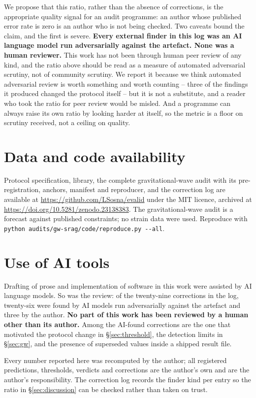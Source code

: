 \documentclass[11pt,a4paper]{article}
\begin{document}
We propose that this ratio, rather than the absence of corrections, is the
appropriate quality signal for an audit programme: an author whose published
error rate is zero is an author who is not being checked. Two caveats bound the
claim, and the first is severe. \textbf{Every external finder in this log was
an AI language model run adversarially against the artefact. None was a human
reviewer.} This work has not been through human peer review of any kind, and
the ratio above should be read as a measure of automated adversarial scrutiny,
not of community scrutiny. We report it because we think automated adversarial
review is worth something and worth counting -- three of the findings it
produced changed the protocol itself -- but it is not a substitute, and a
reader who took the ratio for peer review would be misled. And a programme can
always raise its own ratio by looking
harder at itself, so the metric is a floor on scrutiny received, not a ceiling
on quality.

\section*{Data and code availability}

Protocol specification, library, the complete gravitational-wave audit with its
pre-registration, anchors, manifest and reproducer, and the correction log are
available at \url{https://github.com/LSosna/evalid} under the MIT licence, archived at
\url{https://doi.org/10.5281/zenodo.23138383}. The gravitational-wave audit is a forecast against published
constraints; no strain data were used. Reproduce with
\texttt{python audits/gw-srag/code/reproduce.py -{}-all}.

\section*{Use of AI tools}

Drafting of prose and implementation of software in this work were assisted by
AI language models. So was the review: of the twenty-nine corrections in the
log, twenty-six were found by AI models run adversarially against the artefact
and three by the author. \textbf{No part of this work has been reviewed by a
human other than its author.} Among the AI-found corrections are the one that
motivated the protocol change in \S\ref{sec:threshold}, the detection limits
in \S\ref{sec:gw}, and the presence of superseded values inside a shipped
result file.

Every number reported here was recomputed by the author; all registered
predictions, thresholds, verdicts and corrections are the author's own and are
the author's responsibility. The correction log records the finder kind per
entry so the ratio in \S\ref{sec:discussion} can be checked rather than taken
on trust.
\end{document}
